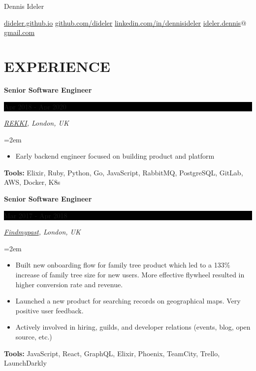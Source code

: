 \documentclass[paper=a4,fontsize=11pt]{scrartcl} %
\newlength{\spacebox}
\newcommand{\sepspace}{\vspace*{1em}}     %
\newcommand{\FullName}[1]{
    \Huge \usefont{OT1}{phv}{b}{n} \hfill #1
    \par \normalsize \normalfont}
\newcommand{\Slogan}[1]{
    \large \usefont{OT1}{phv}{m}{n}\hfill \textit{#1}
    \par \normalsize \normalfont}
\newcommand{\NewPart}[1]{\section*{\uppercase{#1}}}
\newcommand{\PersonalEntry}[2]{
    \noindent\hangindent=2em\hangafter=0  %
    \parbox{\spacebox}{                   %
    \textit{#1}}                          %
    \hspace{1.5em} #2 \par}               %
\newcommand{\EducationEntry}[4]{
    \noindent \textbf{#1} \hfill        %
    \colorbox{Black}{
      \parbox{8.5em}{
      \hfill\color{White}#2}} \par      %
    \noindent \textit{#3} \par          %
    \noindent\hangindent=2em\hangafter=0 \small #4 %
    \normalsize \par}
\newcommand{\WorkEntry}[4]{             %
    \noindent \textbf{#1} \hfill        %
    \colorbox{Black}{%
      \parbox{9em}{%
      \hfill\color{White}#2}} \par      %
        \noindent \textit{#3} \par      %
    \noindent\hangindent=2em\hangafter=0 \small #4 %
    \normalsize \par}
\begin{document}
\FullName{Dennis Ideler}
\bigskip
{\small
  \href{https://dideler.github.io}{dideler.github.io} \quad
  \href{https://github.com/dideler}{github.com/dideler} \quad
  \href{https://linkedin.com/in/dennisideler}{linkedin.com/in/dennisideler} \quad
  \href{mailto:ideler.dennis@gmail.com}{ideler.dennis$@$gmail.com}
}

\sepspace

%


\NewPart{Experience}{}


\WorkEntry{Senior Software Engineer}{Apr 2018 - Apr 2020}
{\href{https://rekki.com/}{REKKI}, London, UK}
{
  \begin{itemize} \itemsep -1pt
    \item Early backend engineer focused on building product and platform
   \end{itemize}
  \textbf{Tools:} Elixir, Ruby, Python, Go, JavaScript, RabbitMQ, PostgreSQL, GitLab, AWS, Docker, K8s
}
\sepspace

\WorkEntry{Senior Software Engineer}{Mar 2017 - Apr 2018}
{\href{https://www.findmypast.co.uk/}{Findmypast}, London, UK}
{
  \begin{itemize} \itemsep -1pt
    \item Built new onboarding flow for family tree product which led to a 133\% increase of family tree size for new users.
    More effective flywheel resulted in higher conversion rate and revenue.
    \item Launched a new product for searching records on geographical maps. Very positive user feedback.
    \item Actively involved in hiring, guilds, and developer relations (events, blog, open source, etc.)
  \end{itemize}
  \textbf{Tools:} JavaScript, React, GraphQL, Elixir, Phoenix, TeamCity, Trello, LaunchDarkly
}
\sepspace
\end{document}
